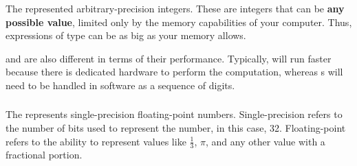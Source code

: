 \subsubsection{\texorpdfstring{}{\texttt{Integer}}}\label{subsubsec:Integer_Type}
The   represented arbitrary-precision integers.
These are integers that can be \textbf{any possible value}, limited only by the memory capabilities of your computer.
Thus, expressions of type  can be as big as your memory allows.

 and  are also different in terms of their performance.
Typically,  will run faster because there is dedicated hardware to perform the computation, whereas s will need to be handled in software as a sequence of digits.

\subsubsection{\texorpdfstring{}{\texttt{Float}}}\label{subsubsec:Float_Type}
The   represents single-precision floating-point numbers.
Single-precision refers to the number of bits used to represent the number, in this case, 32.
Floating-point refers to the ability to represent values like $\frac{1}{3}$, $\pi$, and any other value with a fractional portion.

